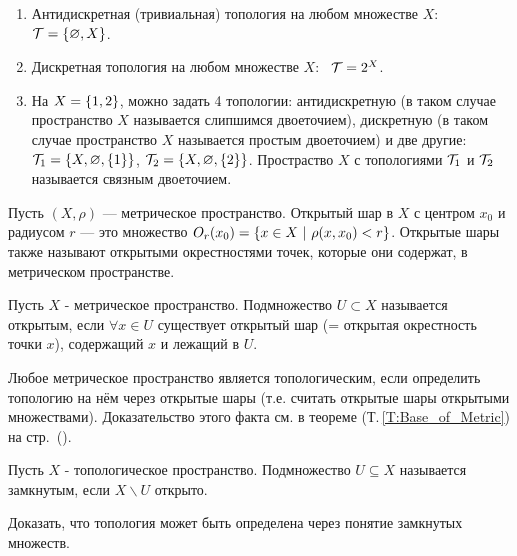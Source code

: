 \begin{example}
    \begin{enumerate}
        \item Антидискретная (тривиальная) топология на любом множестве $X$: \ $\mathcal{T} = \left\{\varnothing, X\right\}$.
        \item Дискретная топология на любом множестве $X$: \ $\mathcal{T} = 2^X$.
        \item На $X = \left\{1, 2\right\}$, можно задать 4 топологии: антидискретную (в таком случае пространство $X$ называется слипшимся двоеточием), дискретную (в таком случае пространство $X$ называется простым двоеточием) и две другие: \ $\mathcal{T}_1 = \left\{X, \varnothing, \left\{1\right\}\right\}$, $\mathcal{T}_2 = \left\{X, \varnothing, \left\{2\right\}\right\}$.
        Простраство $X$ с топологиями $\mathcal{T}_1$ и $\mathcal{T}_2$ называется связным двоеточием.
    \end{enumerate}
\end{example}

\begin{definition}
    Пусть $(X, \rho)$ --- метрическое пространство. Открытый шар в $X$ с центром $x_0$ и радиусом $r$ --- это множество $O_r(x_0) = \cbr{x \in X \ | \ \rho(x, x_0) < r}$. Открытые шары также называют открытыми окрестностями точек, которые они содержат, в метрическом пространстве.
\end{definition}

\begin{definition}
    Пусть $X$ - метрическое пространство. Подмножество $U \subset X$ называется открытым, если $\forall x \in U$ существует открытый шар (= открытая окрестность точки $x$), содержащий $x$ и лежащий в $U$. 
\end{definition}

\begin{nota_bene}
    Любое метрическое пространство является топологическим, если определить топологию на нём через открытые шары (т.е. считать открытые шары открытыми множествами). Доказательство этого факта см. в теореме (Т.\,\ref{T:Base_of_Metric}) на стр.~(\pageref{T:Base_of_Metric}).
\end{nota_bene}

\begin{definition}
    Пусть $X$ - топологическое пространство. Подмножество $U \subseteq X$ называется замкнутым, если $X \backslash U$ открыто.
\end{definition}

\begin{exercise}
    Доказать, что топология может быть определена через понятие замкнутых множеств.
\end{exercise}

